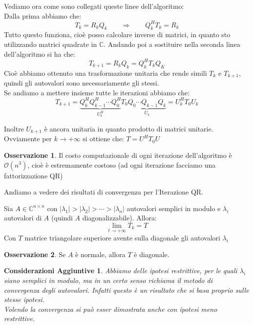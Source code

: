 \documentclass[11pt,a4paper,twoside]{article}
\newtheorem*{cons}{Considerazioni Aggiuntive}
\theoremstyle{definition}
\newtheorem*{oss}{Osservazione}
\begin{document}
Vediamo ora come sono collegati queste linee dell'algoritmo:\\
Dalla prima abbiamo che:
\[T_k = R_kQ_k \qquad \Rightarrow \qquad Q_k^HT_k = R_k\]
Tutto questo funziona, cioè posso calcolare inverse di matrici, in quanto sto utilizzando matrici quadrate in $\mathbb C$. Andando poi a sostituire nella seconda linea dell'algoritmo si ha che:
\[ T_{k+1} = R_k Q_k = Q_k^H T_k Q_K \]
Cioè abbiamo ottenuto una trasformazione unitaria che rende simili $T_k$ e $T_{k+1}$, quindi gli autovalori sono necessariamente gli stessi.\\
Se andiamo a mettere insieme tutte le iterazioni abbiamo che:
\[ T_{k+1} = \underbrace{Q_k^H Q_{k-1}^H \cdots Q_0^H}_{U_k^H} T_0 \underbrace{Q_0 \cdots Q_{k-1} Q_k}_{U_k} = U_k^H T_0 U_k \]

Inoltre $U_{k+1}$ è ancora unitaria in quanto prodotto di matrici unitarie.\\
Ovviamente per $k \to +\infty$ si ottiene che: $T = U^HT_0U$

\begin{oss}
	Il costo computazionale di ogni iterazione dell'algoritmo è $\mathcal O(n^3)$, cioè è estremamente costoso (ad ogni iterazione facciamo una fattorizzazione QR)
\end{oss}

Andiamo a vedere dei risultati di convergenza per l'Iterazione QR.

\begin{thm}{}{}
	Sia $A \in \mathbb C^{n \times n}$ con $|\lambda_1|>|\lambda_2|>\cdots > |\lambda_n|$ autovalori semplici in modulo e $\lambda_i$ autovalori di $A$ (quindi $A$ diagonalizzabile). Allora:
	\[ \lim_{t \to +\infty} T_k = T \]
	Con $T$ matrice triangolare superiore avente sulla diagonale gli autovalori $\lambda_i$
\end{thm}

\begin{oss}
	Se $A$ è normale, allora $T$ è diagonale.
\end{oss}

\begin{cons}
	Abbiamo delle ipotesi restrittive, per le quali $\lambda_i$ siano semplici in modulo, ma in un certo senso richiama il metodo di convergenza degli autovalori. Infatti questo è un risultato che si basa proprio sulle stesse ipotesi.\\
	Volendo la convergenza si può esser dimostrata anche con ipotesi meno restrittive.
\end{cons}
\end{document}
